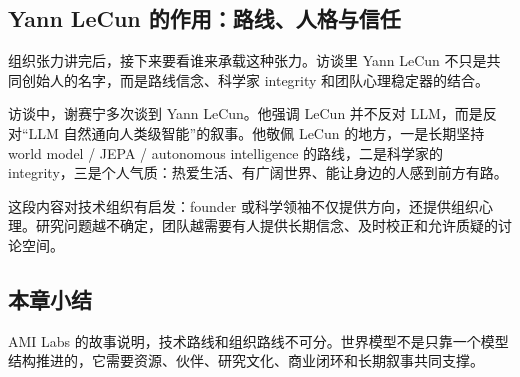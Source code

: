 \subsection{Yann LeCun 的作用：路线、人格与信任}

组织张力讲完后，接下来要看谁来承载这种张力。访谈里 Yann LeCun 不只是共同创始人的名字，而是路线信念、科学家 integrity 和团队心理稳定器的结合。

访谈中，谢赛宁多次谈到 Yann LeCun。他强调 LeCun 并不反对 LLM，而是反对“LLM 自然通向人类级智能”的叙事。他敬佩 LeCun 的地方，一是长期坚持 world model / JEPA / autonomous intelligence 的路线，二是科学家的 integrity，三是个人气质：热爱生活、有广阔世界、能让身边的人感到前方有路。

这段内容对技术组织有启发：founder 或科学领袖不仅提供方向，还提供组织心理。研究问题越不确定，团队越需要有人提供长期信念、及时校正和允许质疑的讨论空间。

\subsection{本章小结}

AMI Labs 的故事说明，技术路线和组织路线不可分。世界模型不是只靠一个模型结构推进的，它需要资源、伙伴、研究文化、商业闭环和长期叙事共同支撑。

